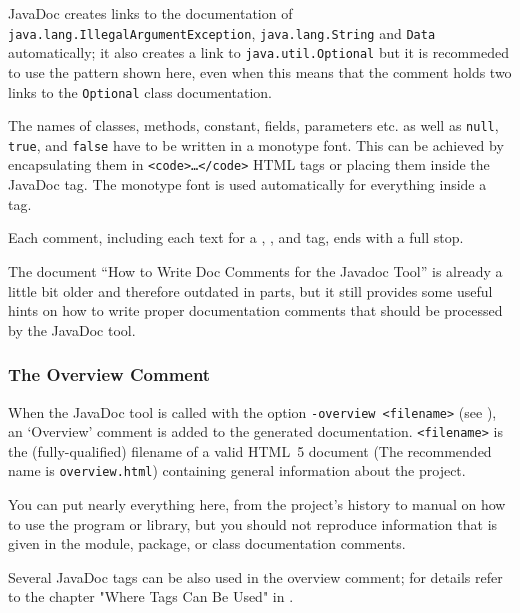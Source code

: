 \documentclass[11pt,a4paper, titlepage, parskip=half, headsepline, footsepline, cleardoublepage=current, headheight=1cm]{scrbook}
\begin{document}
JavaDoc creates links to the documentation of \lstinline|java.lang.IllegalArgumentException|, \lstinline|java.lang.String| and \lstinline|Data| automatically; it also creates a link to \lstinline|java.util.Optional| but it is recommeded to use the pattern shown here, even when this means that the comment holds two links to the \lstinline|Optional| class documentation.

The names of classes, methods, constant, fields, parameters etc. as well as \lstinline|null|, \lstinline|true|, and \lstinline|false| have to be written in a monotype font. This can be achieved by encapsulating them in \lstinline|<code>…</code>| HTML tags or placing them inside the JavaDoc  tag. The monotype font is used automatically for everything inside a  tag.

Each comment, including each text for a , , and  tag, ends with a full stop.

The document “How to Write Doc Comments for the Javadoc Tool”\autocite{ORACLE_DOC_JAVADOC_HOWTO} is already a little bit older and therefore outdated in parts, but it still provides some useful hints on how to write proper documentation comments that should be processed by the JavaDoc tool.


\subsubsection{The Overview Comment}\label{sec:OverviewComment}
When the JavaDoc tool is called with the option \verb#-overview <filename># (see \autocite{ORACLE_DOC_JAVADOC_MAN:StandardDocletOptions}), an ‘Overview’ comment is  added to the generated documentation. \verb#<filename># is the (fully-qualified)  filename of a valid HTML~5 document (The recommended name is \verb#overview.html#) containing general information about the project.

You can put nearly everything here, from the project's history to manual on how to use the program or library, but you should not reproduce information that is given in the module, package, or class documentation comments.

Several JavaDoc tags can be also used in the overview comment; for details refer to the chapter "Where Tags Can Be Used" in \autocite{ORACLE_DOC_JAVADOC_TAG}.
\end{document}
